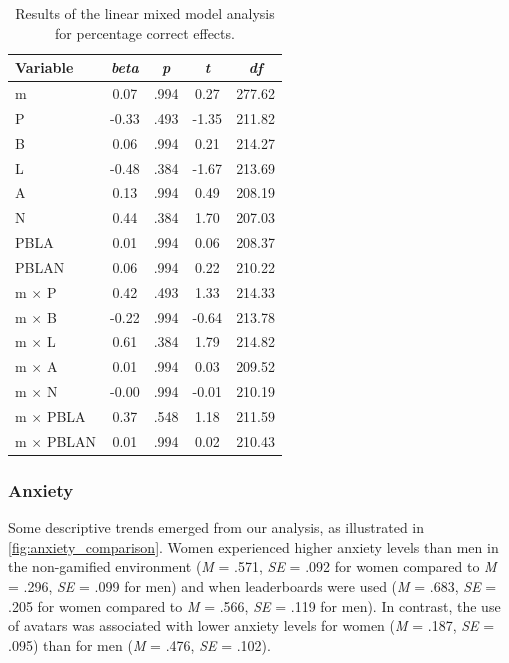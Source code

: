 \begin{table}[h]
    \centering
    \caption{Results of the linear mixed model analysis for percentage correct effects.}
    \label{tab:lmm_performance}
    \begin{tabular}{lcccc}
        \hline
        Variable & \textit{beta} & \textit{p} & \textit{t} & \textit{df} \\
        \hline
        m & 0.07 & .994 & 0.27 & 277.62 \\
        P & -0.33 & .493 & -1.35 & 211.82 \\
        B & 0.06 & .994 & 0.21 & 214.27 \\
        L & -0.48 & .384 & -1.67 & 213.69 \\
        A & 0.13 & .994 & 0.49 & 208.19 \\
        N & 0.44 & .384 & 1.70 & 207.03 \\
        PBLA & 0.01 & .994 & 0.06 & 208.37 \\
        PBLAN & 0.06 & .994 & 0.22 & 210.22 \\
        m $\times$ P & 0.42 & .493 & 1.33 & 214.33 \\
        m $\times$ B & -0.22 & .994 & -0.64 & 213.78 \\
        m $\times$ L & 0.61 & .384 & 1.79 & 214.82 \\
        m $\times$ A & 0.01 & .994 & 0.03 & 209.52 \\
        m $\times$ N & -0.00 & .994 & -0.01 & 210.19 \\
        m $\times$ PBLA & 0.37 & .548 & 1.18 & 211.59 \\
        m $\times$ PBLAN & 0.01 & .994 & 0.02 & 210.43 \\
        \hline
    \end{tabular}
\end{table}




\subsubsection{Anxiety}
Some descriptive trends emerged from our analysis, as illustrated in \autoref{fig:anxiety_comparison}.
Women experienced higher anxiety levels than men in the non-gamified environment (\textit{M} = .571, \textit{SE} = .092 for women compared to \textit{M} = .296, \textit{SE} = .099 for men) and when leaderboards were used (\textit{M} = .683, \textit{SE} = .205 for women compared to \textit{M} = .566, \textit{SE} = .119 for men).
In contrast, the use of avatars was associated with lower anxiety levels for women (\textit{M} = .187, \textit{SE} = .095) than for men (\textit{M} = .476, \textit{SE} = .102).

